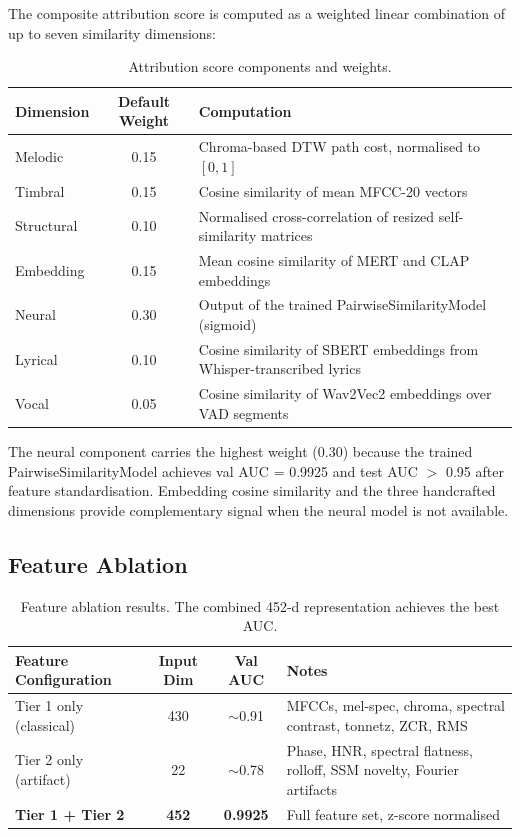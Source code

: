 \documentclass[11pt,a4paper]{article}
\begin{document}
The composite attribution score is computed as a weighted linear combination of up to seven similarity dimensions:

\begin{table}[H]
\centering
\begin{tabular}{lcp{7cm}}
\toprule
\textbf{Dimension} & \textbf{Default Weight} & \textbf{Computation} \\
\midrule
Melodic & 0.15 & Chroma-based DTW path cost, normalised to $[0,1]$ \\
Timbral & 0.15 & Cosine similarity of mean MFCC-20 vectors \\
Structural & 0.10 & Normalised cross-correlation of resized self-similarity matrices \\
Embedding & 0.15 & Mean cosine similarity of MERT and CLAP embeddings \\
Neural & 0.30 & Output of the trained PairwiseSimilarityModel (sigmoid) \\
Lyrical & 0.10 & Cosine similarity of SBERT embeddings from Whisper-transcribed lyrics \\
Vocal & 0.05 & Cosine similarity of Wav2Vec2 embeddings over VAD segments \\
\bottomrule
\end{tabular}
\caption{Attribution score components and weights.}
\end{table}

The neural component carries the highest weight (0.30) because the trained PairwiseSimilarityModel achieves val AUC = 0.9925 and test AUC $>$ 0.95 after feature standardisation. Embedding cosine similarity and the three handcrafted dimensions provide complementary signal when the neural model is not available.

\subsection{Feature Ablation}
\label{sec:ablation}

\begin{table}[H]
\centering
\begin{tabular}{lccp{6.5cm}}
\toprule
\textbf{Feature Configuration} & \textbf{Input Dim} & \textbf{Val AUC} & \textbf{Notes} \\
\midrule
Tier 1 only (classical) & 430 & $\sim$0.91 & MFCCs, mel-spec, chroma, spectral contrast, tonnetz, ZCR, RMS \\
Tier 2 only (artifact) & 22 & $\sim$0.78 & Phase, HNR, spectral flatness, rolloff, SSM novelty, Fourier artifacts \\
\textbf{Tier 1 + Tier 2} & \textbf{452} & \textbf{0.9925} & Full feature set, z-score normalised \\
\bottomrule
\end{tabular}
\caption{Feature ablation results. The combined 452-d representation achieves the best AUC.}
\label{tab:ablation}
\end{table}
\end{document}
